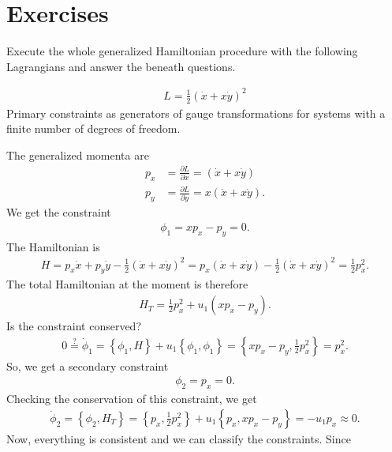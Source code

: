 \chapter{Exercises}

Execute the whole generalized Hamiltonian procedure with the following Lagrangians and answer the beneath questions.

\begin{exercise}
\begin{align*}
L = \frac{1}{2} (\dot{x} + x \dot{y})^2 
\end{align*}
Primary constraints as generators of gauge transformations for systems with a finite number of degrees of freedom.
\end{exercise}
\begin{solution}
The generalized momenta are
\begin{align*}
p_x &= \frac{\partial L}{\partial \dot{x}} = (\dot{x} + x \dot{y}) \\
p_y &= \frac{\partial L}{\partial \dot{y}} = x (\dot{x} + x \dot{y}).
\end{align*}
We get the constraint 
\begin{align*}
\phi_1 = x p_x - p_y = 0.
\end{align*}
The Hamiltonian is
\begin{align*}
H = p_x \dot{x} + p_y \dot{y} - \frac{1}{2} (\dot{x} + x \dot{y})^2 = p_x (\dot{x} + x \dot{y}) - \frac{1}{2} (\dot{x} + x \dot{y})^2 = \frac{1}{2} p_x^2.
\end{align*}
The total Hamiltonian at the moment is therefore
\begin{align*}
H_T = \frac{1}{2} p_x^2 + u_1 (x p_x - p_y).
\end{align*}
Is the constraint conserved?
\begin{align*}
0 \overset{?}{=} \dot{\phi}_1 = \left \{ \phi_1,H \right \} + u_1 \left \{ \phi_1,\phi_1 \right \} = \left \{ x p_x - p_y,\frac{1}{2} p_x^2 \right \} = p_x^2.
\end{align*}
So, we get a secondary constraint
\begin{align*}
\phi_2 = p_x = 0.
\end{align*}
Checking the conservation of this constraint, we get
\begin{align*}
\dot{\phi}_2 = \left \{ \phi_2,H_T \right \} = \left \{ p_x,\frac{1}{2} p_x^2 \right \} + u_1 \left \{ p_x,x p_x - p_y \right \} = - u_1 p_x \approx 0.
\end{align*}
Now, everything is consistent and we can classify the constraints. Since

\end{solution}
